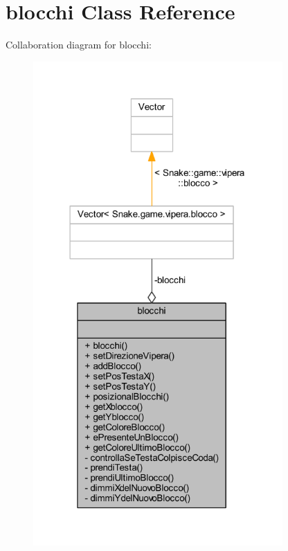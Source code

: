 \hypertarget{class_snake_1_1game_1_1vipera_1_1blocchi}{}\section{blocchi Class Reference}
\label{class_snake_1_1game_1_1vipera_1_1blocchi}


Collaboration diagram for blocchi\+:
\nopagebreak
\begin{figure}[H]
\begin{center}
\leavevmode
\includegraphics[width=270pt]{class_snake_1_1game_1_1vipera_1_1blocchi__coll__graph}
\end{center}
\end{figure}
